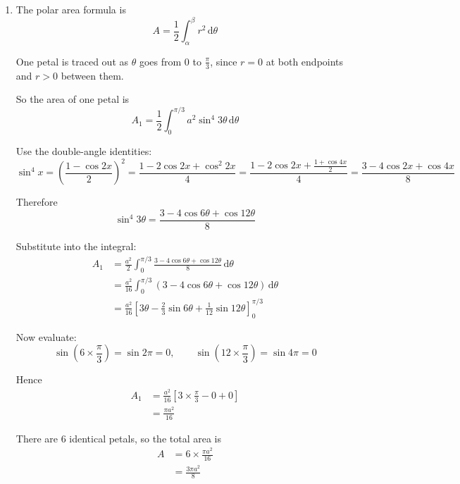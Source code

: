 \documentclass[leqno]{article}
\begin{document}
\begin{enumerate}[
	  label=\textbf{\arabic*.},
	  leftmargin=*,
	  topsep=0pt,
	  partopsep=0pt,
	  parsep=0pt
	]
\begin{djsSolution}
\begin{enumerate}[label=\textbf{(\alph*)}]
	  \item The polar area formula is
		\[
		A=\frac12\int_{\alpha}^{\beta} r^2\,\mathrm{d}\theta
		\]
	
		One petal is traced out as $\theta$ goes from $0$ to $\tfrac{\pi}{3}$, since $r=0$ at both endpoints and $r>0$ between them.
	
		So the area of one petal is
		\[
		A_1=\frac{1}{2}\int_0^{\pi/3} a^2\sin^4 3\theta\,\mathrm{d}\theta
		\]
	
		Use the double-angle identities:
		\[
		\sin^4 x=\left(\frac{1-\cos 2x}{2}\right)^2
		=\frac{1-2\cos 2x+\cos^2 2x}{4}
		=\frac{1-2\cos 2x+\frac{1+\cos 4x}{2}}{4}
		=\frac{3-4\cos 2x+\cos 4x}{8}
		\]
	
		Therefore
		\[
		\sin^4 3\theta=\frac{3-4\cos 6\theta+\cos 12\theta}{8}
		\]
	
		Substitute into the integral:
		\begin{align*}
		A_1
		&=\frac{a^2}{2}\int_0^{\pi/3}\frac{3-4\cos 6\theta+\cos 12\theta}{8}\,\mathrm{d}\theta\\
		&=\frac{a^2}{16}\int_0^{\pi/3}\left(3-4\cos 6\theta+\cos 12\theta\right)\,\mathrm{d}\theta\\
		&=\frac{a^2}{16}\left[3\theta-\frac{2}{3}\sin 6\theta+\frac{1}{12}\sin 12\theta\right]_0^{\pi/3}
		\end{align*}
	
		Now evaluate:
		\[
		\sin\left(6\times\frac{\pi}{3}\right)=\sin 2\pi=0,
		\qquad
		\sin\left(12\times\frac{\pi}{3}\right)=\sin 4\pi=0
		\]
	
		Hence
		\begin{align*}
		A_1
		&=\frac{a^2}{16}\left[3\times\frac{\pi}{3}-0+0\right]\\
		&=\frac{\pi a^2}{16}
		\end{align*}
	
		There are 6 identical petals, so the total area is
		\begin{align*}
		A
		&=6\times\frac{\pi a^2}{16}\\
		&=\frac{3\pi a^2}{8}
		\end{align*}
	\end{enumerate}
	\end{djsSolution}
	
	
	\newpage
	
\questionitem

\begin{figure}[H]
    \centering
{}
\end{figure}
\end{enumerate}
\end{document}
